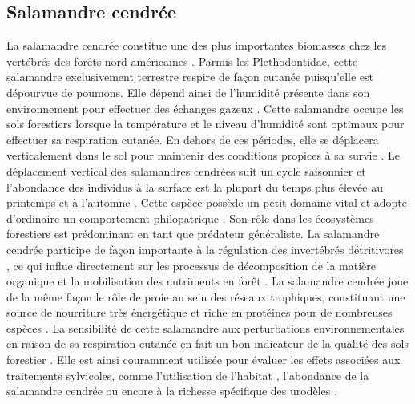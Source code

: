 \subsection*{Salamandre cendrée}

La salamandre cendrée constitue une des plus importantes biomasses chez les vertébrés des forêts nord-américaines \citep{Burton1975Salamanderpopulations,Petranka1993Effectstimber,semlitschAbundanceBiomassProduction2014a}.
Parmis les Plethodontidae, cette salamandre exclusivement terrestre respire de façon cutanée puisqu'elle est dépourvue de poumons. 
Elle dépend ainsi de l'humidité présente dans son environnement pour effectuer des échanges gazeux \citep{Heatwole1961Relationsubstrate}. 
Cette salamandre occupe les sols forestiers lorsque la température et le niveau d'humidité sont optimaux pour effectuer sa respiration cutanée. 
En dehors de ces périodes, elle se déplacera verticalement dans le sol pour maintenir des conditions propices à sa survie \citep{Grizzell1949HibernationSite}.  
Le déplacement vertical des salamandres cendrées suit un cycle saisonnier et l’abondance des individus à la surface est la plupart du temps plus élevée au printemps et à l’automne \citep{FraserEmpiricalEvaluation1976,Jaeger1980MicrohabitatsTerrestrial}.
Cette espèce possède un petit domaine vital et adopte d’ordinaire un comportement philopatrique \citep{Yurewicz2004ResourceAvailability}.
Son rôle dans les écosystèmes forestiers est prédominant en tant que prédateur généraliste. 
La salamandre cendrée participe de façon importante à la régulation des invertébrés détritivores \citep{Burton1975Energyflow,Walton2013Topdownregulation,Hickerson2017Easternredbacked}, 
ce qui influe directement sur les processus de décomposition de la matière organique et la mobilisation des nutriments en forêt \citep{Burton1975Energyflow,Wyman1998Experimentalassessment}. 
La salamandre cendrée joue de la même façon le rôle de proie au sein des réseaux trophiques, constituant une source de nourriture très énergétique et riche en protéines pour de nombreuses espèces \citep{Burton1975Energyflow,Pough1987abundancesalamanders}.
La sensibilité de cette salamandre aux perturbations environnementales en raison de sa respiration cutanée en fait un bon indicateur de la qualité des sols forestier \citep{Welsh2001caseusing}.
Elle est ainsi couramment utilisée pour évaluer les effets associées aux traitements sylvicoles, comme l’utilisation de l’habitat \citep{Heatwole1962EnvironmentalFactors,gibbsDistributionWoodlandAmphibians1998,Baecher2018Environmentalgradients,Mossman2019Twosalamander}, 
l'abondance de la salamandre cendrée \citep{Harpole1999Effectsseven,Grialou2000effectsforest,Homyack2009Longtermeffects,Hocking2013Effectsexperimental,Mazerolle2021Woodlandsalamander} 
ou encore à la richesse spécifique des urodèles \citep{Petranka1993Effectstimber,Welsh2001caseusing}.

